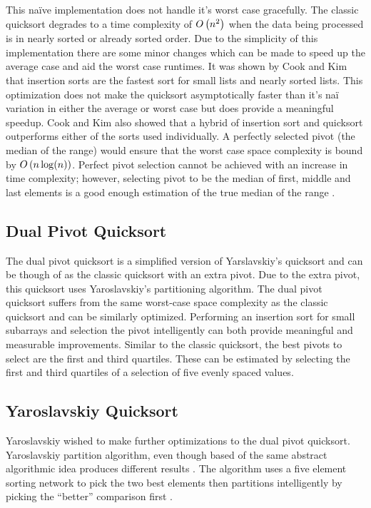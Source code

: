         This na\"{i}ve implementation does not handle it's worst case gracefully. The classic quicksort degrades to a time complexity of $O\left(n^2\right)$ when the data being processed is in nearly sorted or already sorted order. Due to the simplicity of this implementation there are some minor changes which can be made to speed up the average case and aid the worst case runtimes. It was shown by Cook and Kim \cite{cook1980best} that insertion sorts are the fastest sort for small lists and nearly sorted lists. This optimization does not make the quicksort asymptotically faster than it's na\"{i} variation in either the average or worst case but does provide a meaningful speedup. Cook and Kim also showed that a hybrid of insertion sort and quicksort outperforms either of the sorts used individually. A perfectly selected pivot (the median of the range) would ensure that the worst case space complexity is bound by $O\left(n\log(n)\right)$. Perfect pivot selection cannot be achieved with an increase in time complexity; however, selecting pivot to be the median of first, middle and last elements is a good enough estimation of the true median of the range \cite{sedgewick1978implementing}.


	\subsection{Dual Pivot Quicksort}
		\label{subsec:DualPivotQSortIntro}
        The dual pivot quicksort is a simplified version of Yarslavskiy's quicksort and can be though of as the classic quicksort with an extra pivot. Due to the extra pivot, this quicksort uses Yaroslavskiy's partitioning algorithm. The dual pivot quicksort suffers from the same worst-case space complexity as the classic quicksort and can be similarly optimized. Performing an insertion sort for small subarrays and selection the pivot intelligently can both provide meaningful and measurable improvements. Similar to the classic quicksort, the best pivots to select are the first and third quartiles. These can be estimated by selecting the first and third quartiles of a selection of five evenly spaced values.
	
	\subsection{Yaroslavskiy Quicksort}    
        \label{subsec:YaroslavskiyQSortIntro}
		Yaroslavskiy wished to make further optimizations to the dual pivot quicksort. Yaroslavskiy partition algorithm, even though based of the same abstract algorithmic idea produces different results \cite{Wild:2012:ACA:2404160.2404231}. The algorithm uses a five element sorting network to pick the two best elements then partitions intelligently by picking the ``better'' comparison first \cite{Wild:2012:ACA:2404160.2404231}.
		
